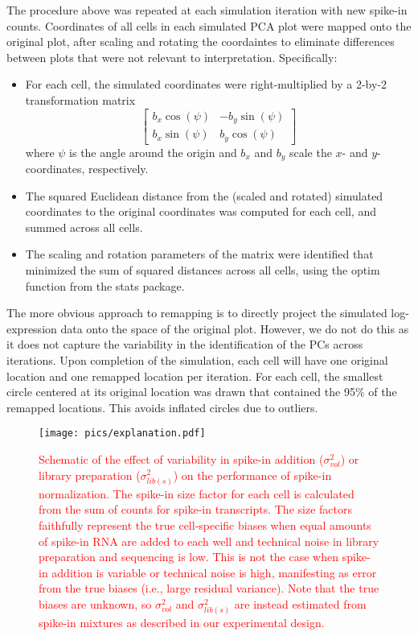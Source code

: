 \documentclass{article}
\newcommand\revised[1]{\textcolor{red}{#1}}
\begin{document}
The procedure above was repeated at each simulation iteration with new spike-in counts.
Coordinates of all cells in each simulated PCA plot were mapped onto the original plot, after scaling and rotating the coordaintes to eliminate differences between plots that were not relevant to interpretation.
Specifically:
\begin{itemize}
    \item For each cell, the simulated coordinates were right-multiplied by a 2-by-2 transformation matrix
        \[
            \left[\begin{array}{cc}
                    b_x \cos(\psi) & - b_y \sin(\psi) \\
                    b_x \sin(\psi) & b_y \cos(\psi) 
                \end{array}
            \right]
        \]
        where $\psi$ is the angle around the origin and $b_x$ and $b_y$ scale the $x$- and $y$-coordinates, respectively.
    \item The squared Euclidean distance from the (scaled and rotated) simulated coordinates to the original coordinates was computed for each cell, and summed across all cells.
    \item The scaling and rotation parameters of the matrix were identified that minimized the sum of squared distances across all cells, using the optim function from the stats package.
\end{itemize}
The more obvious approach to remapping is to directly project the simulated log-expression data onto the space of the original plot.
However, we do not do this as it does not capture the variability in the identification of the PCs across iterations.
Upon completion of the simulation, each cell will have one original location and one remapped location per iteration. 
For each cell, the smallest circle centered at its original location was drawn that contained the 95\% of the remapped locations.
This avoids inflated circles due to outliers.

\printbibliography

\newpage

\begin{figure}[btp]
    \begin{center}
        \texttt{[image: pics/explanation.pdf]}
    \end{center}
    \caption{\revised{Schematic of the effect of variability in spike-in addition ($\sigma^2_{vol}$) or library preparation ($\sigma^2_{lib(s)}$) on the performance of spike-in normalization.
        The spike-in size factor for each cell is calculated from the sum of counts for spike-in transcripts.
        The size factors faithfully represent the true cell-specific biases when equal amounts of spike-in RNA are added to each well and technical noise in library preparation and sequencing is low.
        This is not the case when spike-in addition is variable or technical noise is high, manifesting as error from the true biases (i.e., large residual variance).
    Note that the true biases are unknown, so $\sigma^2_{vol}$ and $\sigma^2_{lib(s)}$ are instead estimated from spike-in mixtures as described in our experimental design.}
    }
\end{figure}
\end{document}
